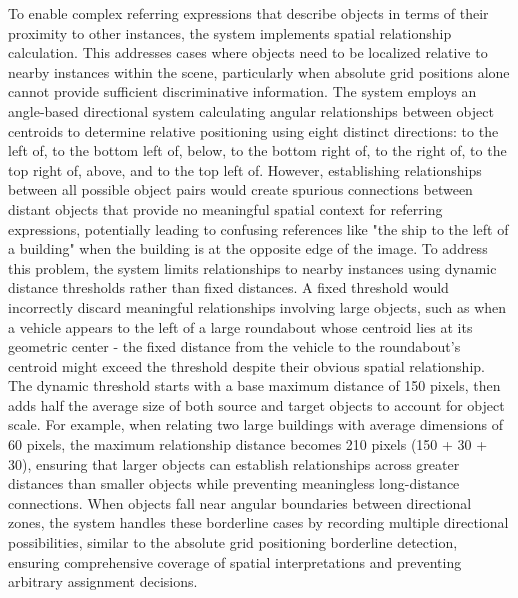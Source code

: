 To enable complex referring expressions that describe objects in terms of their proximity to other instances, the system implements spatial relationship calculation. This addresses cases where objects need to be localized relative to nearby instances within the scene, particularly when absolute grid positions alone cannot provide sufficient discriminative information. The system employs an angle-based directional system calculating angular relationships between object centroids to determine relative positioning using eight distinct directions: to the left of, to the bottom left of, below, to the bottom right of, to the right of, to the top right of, above, and to the top left of. However, establishing relationships between all possible object pairs would create spurious connections between distant objects that provide no meaningful spatial context for referring expressions, potentially leading to confusing references like "the ship to the left of a building" when the building is at the opposite edge of the image. To address this problem, the system limits relationships to nearby instances using dynamic distance thresholds rather than fixed distances. A fixed threshold would incorrectly discard meaningful relationships involving large objects, such as when a vehicle appears to the left of a large roundabout whose centroid lies at its geometric center - the fixed distance from the vehicle to the roundabout's centroid might exceed the threshold despite their obvious spatial relationship. The dynamic threshold starts with a base maximum distance of 150 pixels, then adds half the average size of both source and target objects to account for object scale. For example, when relating two large buildings with average dimensions of 60 pixels, the maximum relationship distance becomes 210 pixels (150 + 30 + 30), ensuring that larger objects can establish relationships across greater distances than smaller objects while preventing meaningless long-distance connections. When objects fall near angular boundaries between directional zones, the system handles these borderline cases by recording multiple directional possibilities, similar to the absolute grid positioning borderline detection, ensuring comprehensive coverage of spatial interpretations and preventing arbitrary assignment decisions.

